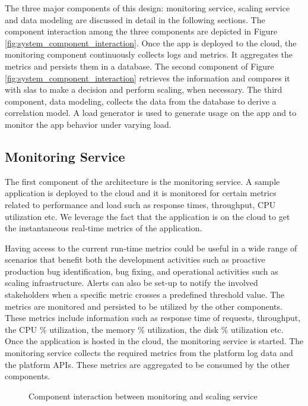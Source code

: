 \documentclass[article,type=msc,colorback,12pt,accentcolor=tud8b,table]{tudthesis}
\begin{document}
	The three major components of this design: monitoring service, scaling service and data modeling are discussed in detail in the following sections. The component interaction among the three components are depicted in Figure \ref{fig:system_component_interaction}. Once the app is deployed to the cloud, the monitoring component continuously collects logs and metrics. It aggregates the metrics and persists them in a database. The second component of Figure \ref{fig:system_component_interaction} retrieves the information and compares it with \gls{sla}s to make a decision and perform scaling, when necessary. The third component, data modeling, collects the data from the database to derive a correlation model. A load generator is used to generate usage on the app and to monitor the app behavior under varying load.

	\subsection{Monitoring Service} 
 	The first component of the architecture is the monitoring service. A sample application is deployed to the cloud and it is monitored for certain metrics related to performance and load such as response times, throughput, CPU utilization etc. We leverage the fact that the application is on the cloud to get the instantaneous real-time metrics of the application. 
 	\par Having access to the current run-time metrics could be useful in a wide range of scenarios that benefit both the development activities such as proactive production bug identification, bug fixing, and operational activities such as scaling infrastructure. Alerts can also be set-up to notify the involved stakeholders when a specific metric crosses a predefined threshold value. The metrics are monitored and persisted to be utilized by the other components. These metrics include information such as response time of requests, throughput, the CPU \% utilization, the memory \% utilization, the disk \% utilization etc. Once the application is hosted in the cloud, the monitoring service is started. 	The monitoring service collects the required metrics from the platform log data and the platform APIs. These metrics are aggregated to be consumed by the other components. 
 	
 	 	 \begin{figure}[!h]
 	 	 	\begin{center}
 	 	 	\end{center}
 	 	 	\caption{Component interaction between monitoring and scaling service}
 	 	 	\label{fig:monitor_scaling}
 	 	 \end{figure}
 	 	 
\end{document}

